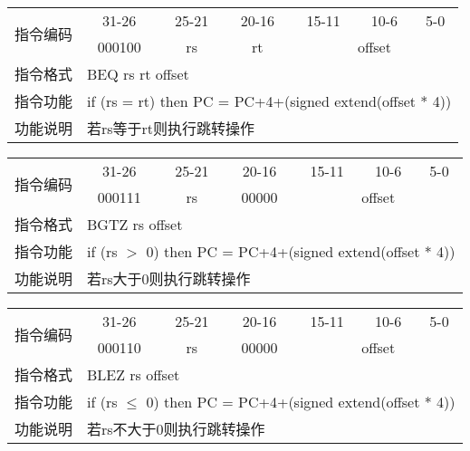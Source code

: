 \documentclass[a4paper,UTF8,fntef]{ctexart}
\begin{document}
	\begin{table}[!hbp]
		\centering
		\begin{tabular}{|c|c|c|c|c|c|c|}
		\hline
		\multirow{2}{*}{指令编码} & 31-26&25-21 & 20-16&15-11 &10-6 &5-0\\
		\cline{2-7} & 000100 & rs & rt & \multicolumn{3}{|c|}{offset} \\
		\hline
		指令格式&\multicolumn{6}{|l|}{BEQ rs rt offset}\\
		\hline		
		指令功能&\multicolumn{6}{|l|}{if (rs = rt) then PC = PC+4+(signed extend(offset * 4))}\\
		\hline		
		功能说明&\multicolumn{6}{|l|}{若rs等于rt则执行跳转操作}\\
		\hline
		\end{tabular}
	\end{table}
	\begin{table}[!hbp]
		\centering
		\begin{tabular}{|c|c|c|c|c|c|c|}
		\hline
		\multirow{2}{*}{指令编码} & 31-26&25-21 & 20-16&15-11 &10-6 &5-0\\
		\cline{2-7} & 000111 & rs & 00000 & \multicolumn{3}{|c|}{offset} \\
		\hline
		指令格式&\multicolumn{6}{|l|}{BGTZ rs offset}\\
		\hline		
		指令功能&\multicolumn{6}{|l|}{if (rs $>$ 0) then PC = PC+4+(signed extend(offset * 4))}\\
		\hline		
		功能说明&\multicolumn{6}{|l|}{若rs大于0则执行跳转操作}\\
		\hline
		\end{tabular}
	\end{table}
	\begin{table}[!hbp]
		\centering
		\begin{tabular}{|c|c|c|c|c|c|c|}
		\hline
		\multirow{2}{*}{指令编码} & 31-26&25-21 & 20-16&15-11 &10-6 &5-0\\
		\cline{2-7} & 000110 & rs & 00000 & \multicolumn{3}{|c|}{offset} \\
		\hline
		指令格式&\multicolumn{6}{|l|}{BLEZ rs offset}\\
		\hline		
		指令功能&\multicolumn{6}{|l|}{if (rs $\leq$ 0) then PC = PC+4+(signed extend(offset * 4))}\\
		\hline		
		功能说明&\multicolumn{6}{|l|}{若rs不大于0则执行跳转操作}\\
		\hline
		\end{tabular}
	\end{table}
\end{document}
